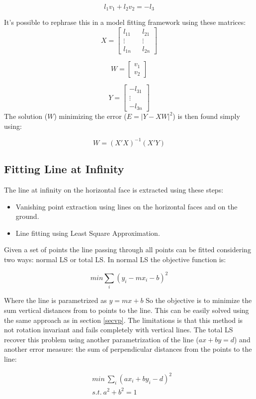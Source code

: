 \documentclass[11pt, oneside]{article}   	%
\begin{document}
$$
l_1 v_1 + l_2 v_2 = -l_3
$$

It's possible to rephrase this in a model fitting framework using these matrices:
$$
X = \begin{bmatrix}
l_{11} && l_{21} \\
\vdots  && \vdots\\
l_{1n} && l_{2n}
\end{bmatrix}
$$ 

$$
W = 
\begin{bmatrix}
v_1 \\
v_2
\end{bmatrix}
$$

$$
Y =
\begin{bmatrix}
-l_{31} \\
\vdots \\
-l_{3n}
\end{bmatrix}
$$
The solution ($W$) minimizing the error ($E = |Y-XW|^2$) is then found simply using:

$$
W = (X'X)^{-1}(X'Y)
$$

\subsection{Fitting Line at Infinity}
The line at infinity on the horizontal face is extracted using these steps:
\begin{itemize}
\item Vanishing point extraction using lines on the horizontal faces and on the ground. 
\item Line fitting using Least Square Approximation.
\end{itemize}

Given a set of points the line passing through all points can be fitted considering two ways: normal LS or total LS.
In normal LS the objective function is:

$$
min  \sum_i (y_i - m x_i - b)^2
$$

Where the line is parametrized as $y = mx + b$ So the objective is to minimize the sum vertical distances from to points to the line.
This can be easily solved using the same approach as in section \ref{secvp}.
The limitations is that this method is not rotation invariant and fails completely with vertical lines.
The total LS recover this problem using another parametrization of the line ($ax + by = d$) and another error measure: the sum of perpendicular distances from the points to the line:

\begin{subequations}
\begin{align*}
& min \ \sum_i (ax_i + by_i - d)^2 \\
& s.t. \ a^2 + b^2 = 1
\end{align*}
\end{subequations}
\end{document}
